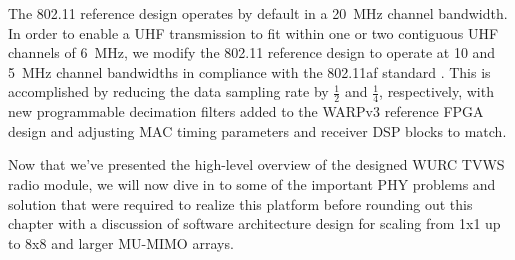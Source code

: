 	The 802.11 reference design operates by default in a 20~MHz channel bandwidth.
	In order to enable a UHF transmission to fit within one or two contiguous UHF channels of 6~MHz, we modify the 802.11 reference design to operate at 10 and 5~MHz channel bandwidths in compliance with the 802.11af standard \cite{warp80211}.
	This is accomplished by reducing the data sampling rate by $\frac{1}{2}$ and $\frac{1}{4}$, respectively, with new programmable decimation filters added to the WARPv3 reference \ac{FPGA} design and adjusting \ac{MAC} timing parameters and receiver \ac{DSP} blocks to match.
	
		Now that we've presented the high-level overview of the designed \ac{WURC} \ac{TVWS} radio module, we will now dive in to some of the important \ac{PHY} problems and solution that were required to realize this platform before rounding out this chapter with a discussion of software architecture design for scaling from 1x1 up to 8x8 and larger \ac{MU-MIMO} arrays.

